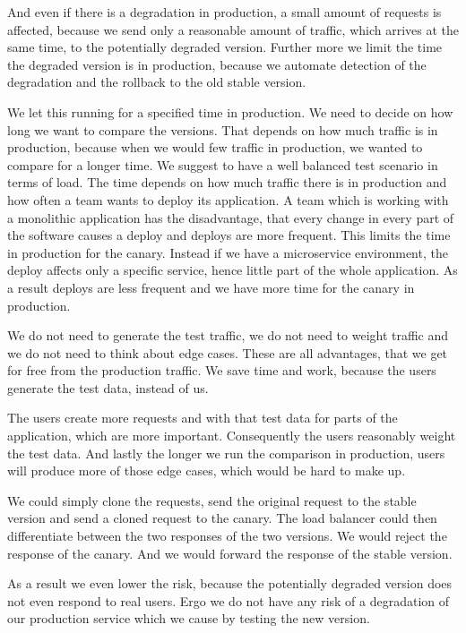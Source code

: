 And even if there is a degradation in production, a small amount of requests is affected,
because we send only a reasonable amount of traffic, which arrives at the same time, to
the potentially degraded version. Further more we limit the time the degraded version is
in production, because we automate detection of the degradation and the rollback to the
old stable version.


We let this running for a specified time in production. We need to decide on how long we
want to compare the versions. That depends on how much traffic is in production, because
when we would few traffic in production, we wanted to compare for a longer time. We
suggest to have a well balanced test scenario in terms of load. The time depends on how
much traffic there is in production and how often a team wants to deploy its
application. A team which is working with a monolithic application has the disadvantage,
that every change in every part of the software causes a deploy and deploys are more
frequent. This limits the time in production for the canary. Instead if we have a
microservice environment, the deploy affects only a specific service, hence little part of
the whole application. As a result deploys are less frequent and we have more time for the
canary in production.

We do not need to generate the test traffic, we do not need to weight traffic and we do
not need to think about edge cases. These are all advantages, that we get for free from
the production traffic. We save time and work, because the users generate the test data,
instead of us.

The users create more requests and with that test data for parts of the application, which
are more important. Consequently the users reasonably weight the test data. And lastly the
longer we run the comparison in production, users will produce more of those edge cases,
which would be hard to make up.

We could simply clone the requests, send the original request to the stable version and
send a cloned request to the canary. The load balancer could then differentiate between the
two responses of the two versions. We would reject the response of the canary. And we
would forward the response of the stable version.

As a result we even lower the risk, because the potentially degraded version does not even
respond to real users. Ergo we do not have any risk of a degradation of our production
service which we cause by testing the new version.

